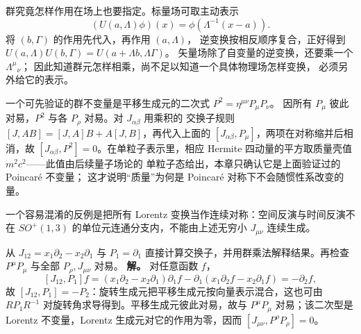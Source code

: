 群究竟怎样作用在场上也要指定。标量场可取主动表示
\[
(U(a,\Lambda)\phi)(x)=\phi(\Lambda^{-1}(x-a)).
\]
将 \((b,\Gamma)\) 的作用先代入，再作用 \((a,\Lambda)\)，
逆变换按相反顺序复合，正好得到
\(U(a,\Lambda)U(b,\Gamma)=U(a+\Lambda b,\Lambda\Gamma)\)。
矢量场除了自变量的逆变换，还要乘一个 \(\Lambda^\mu{}_\nu\)；
因此知道群元怎样相乘，尚不足以知道一个具体物理场怎样变换，
必须另外给它的表示。

一个可先验证的群不变量是平移生成元的二次式
\(P^2=\eta^{\mu\nu}P_\mu P_\nu\)。
因所有 \(P_\mu\) 彼此对易，\(P^2\) 与各 \(P_\rho\) 对易。对 \(J_{\alpha\beta}\) 用乘积的
交换子规则 \([J,AB]=[J,A]B+A[J,B]\)，再代入上面的
\([J_{\alpha\beta},P_\mu]\)，两项在对称缩并后相消，故
\([J_{\alpha\beta},P^2]=0\)。在单粒子表示里，相应 Hermite
四动量的平方取质量壳值 \(m^2c^2\)——此值由后续量子场论的
单粒子态给出，本章只确认它是上面验证过的 Poincaré 不变量；
这才说明“质量”为何是 Poincaré 对称下不会随惯性系改变的量。

一个容易混淆的反例是把所有 Lorentz 变换当作连续对称：空间反演与时间反演不在 \(SO^+(1,3)\) 的单位元连通分支内，不能由上述无穷小 \(J_{\mu\nu}\) 连续生成。



\par
\begin{workedexample}
从 \(J_{12}=x_1\partial_2-x_2\partial_1\) 与 \(P_1=\partial_1\) 直接计算交换子，并用群乘法解释结果。再检查 \(P^\mu P_\mu\) 与全部 \(P_\rho,J_{\mu\nu}\) 对易。
\textbf{解。} 对任意函数 \(f\)，
\[
[J_{12},P_1]f
=(x_1\partial_2-x_2\partial_1)\partial_1f
-\partial_1(x_1\partial_2f-x_2\partial_1f)
=-\partial_2f,
\]
故 \([J_{12},P_1]=-P_2\)：旋转生成元把平移生成元按向量表示混合，这也可由 \(R P_1R^{-1}\) 对旋转角求导得到。平移生成元彼此对易，故与 \(P^\mu P_\mu\) 对易；该二次型是 Lorentz 不变量，Lorentz 生成元对它的作用为零，因而 \([J_{\mu\nu},P^\rho P_\rho]=0\)。
\end{workedexample}
\par
